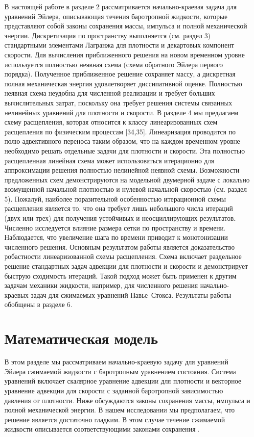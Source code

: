 \documentclass[10pt,twocolumn]{article}
\begin{document}
В настоящей работе в разделе 2 рассматривается начально-краевая задача для уравнений Эйлера, описывающая течения баротропной жидкости, которые представляют собой законы сохранения массы, импульса и полной механической энергии. Дискретизация по пространству выполняется (см. раздел 3) стандартными элементами Лагранжа для плотности и декартовых компонент скорости. Для вычисления приближенного решения на новом временном уровне используется полностью неявная схема (схема обратного Эйлера первого порядка). Полученное приближенное решение сохраняет массу, а дискретная полная механическая энергия удовлетворяет диссипативной оценке. Полностью неявная схема неудобна для численной реализации и требует больших вычислительных затрат, поскольку она требует решения системы связанных нелинейных уравнений для плотности и скорости. В разделе 4 мы предлагаем схему расщепления, которая относится к классу линеаризованных схем расщепления по физическим процессам [34,35]. Линеаризация проводится по полю адвективного переноса таким образом, что на каждом временном уровне необходимо решать отдельные задачи для плотности и скорости. Эта полностью расщепленная линейная схема может использоваться итерационно для аппроксимации решения полностью нелинейной неявной схемы. Возможности предложенных схем демонстрируются на модельной двумерной задаче с локально возмущенной начальной плотностью и нулевой начальной скоростью (см. раздел 5). Пожалуй, наиболее поразительной особенностью итерационной схемы расщепления является то, что она требует лишь небольшого числа итераций (двух или трех) для получения устойчивых и неосциллирующих результатов. Численно исследуется влияние размера сетки по пространству и времени. Наблюдается, что увеличение шага по времени приводит к монотонизации численного решения. Основным результатом работы является доказательство робастности линеаризованной схемы расщепления. Схема включает раздельное решение стандартных задач адвекции для плотности и скорости и демонстрирует быструю сходимость итераций. Такой подход может быть применен к другим задачам механики жидкости, например, для численного решения начально-краевых задач для сжимаемых уравнений Навье–Стокса. Результаты работы обобщены в разделе 6.


\section{Математическая модель}

В этом разделе мы рассматриваем начально-краевую задачу для уравнений Эйлера сжимаемой жидкости с баротропным уравнением состояния. Система уравнений включает скалярное уравнение адвекции для плотности и векторное уравнение адвекции для скорости с заданной баротропной зависимостью давления от плотности. Ниже обсуждаются законы сохранения массы, импульса и полной механической энергии. В нашем исследовании мы предполагаем, что решение является достаточно гладким. В этом случае течение сжимаемой жидкости описывается соответствующими законами сохранения \cite{6,36}.
\end{document}
